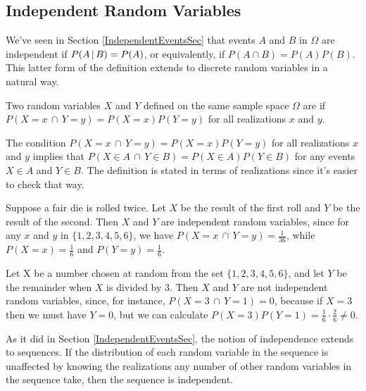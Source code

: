 \subsection*{Independent Random Variables}

We've seen in Section \ref{IndependentEventsSec} that events $A$ and $B$ in $\Omega$ are independent if $P(A \,|\, B) = P(A)$, or equivalently, if $P(A \cap B) = P(A)P(B)$. This latter form of the definition extends to discrete random variables in a natural way.

\begin{definition}\label{IndependenceOfRVs}
Two random variables $X$ and $Y$ defined on the same sample space $\Omega$ are  if $P(X = x \,\cap\, Y = y) = P(X = x)P(Y = y)$ for all realizations $x$ and $y$.\end{definition}

\begin{remark}
The condition $P(X = x \,\cap\, Y = y) = P(X = x)P(Y = y)$ for all realizations $x$ and $y$ implies that $P(X \in A \,\cap\, Y \in B) = P(X \in A)P(Y \in B)$ for any events $X \in A$ and $Y \in B$. The definition is stated in terms of realizations since it's easier to check that way.
\end{remark}

\begin{example}Suppose a fair die is rolled twice. Let $X$ be the result of the first roll and $Y$ be the result of the second. Then $X$ and $Y$ are independent random variables, since for any $x$ and $y$ in $\{1,2,3,4,5,6\}$, we have $P(X = x \,\cap\, Y = y) = \frac{1}{36}$, while $P(X = x) = \frac{1}{6}$ and $P(Y=y) = \frac{1}{6}$.
\end{example}

\begin{example}Let X be a number chosen at random from the set $\{1,2,3,4,5,6\}$, and let $Y$ be the remainder when $X$ is divided by 3. Then $X$ and $Y$ are not independent random variables, since, for instance, $P(X = 3 \,\cap\, Y = 1) = 0$, because if $X = 3$ then we must have $Y = 0$, but we can calculate $P(X = 3)P(Y = 1) = \frac{1}{6}\cdot\frac{2}{6} \neq 0$.
\end{example}

As it did in Section \ref{IndependentEventsSec}, the notion of independence extends to sequences. If the distribution of each random variable in the sequence is unaffected by knowing the realizations any number of other random variables in the sequence take, then the sequence is independent.

